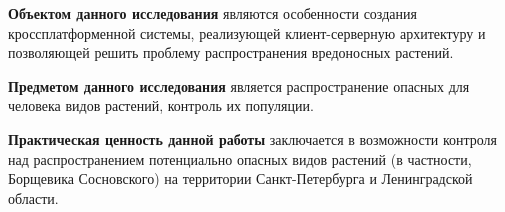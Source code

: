 \nwln
\textbf{Объектом данного исследования} являются особенности создания кроссплатформенной системы, реализующей клиент-серверную архитектуру и позволяющей решить проблему распространения вредоносных растений.

\nwln
\textbf{Предметом данного исследования} является распространение опасных для человека видов растений, контроль их популяции.

\nwln
\textbf{Практическая ценность данной работы} заключается в возможности контроля над распространением потенциально опасных видов растений (в частности, Борщевика Сосновского) на территории Санкт-Петербурга и Ленинградской области. 
